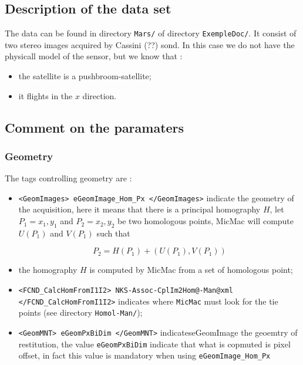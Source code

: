 \subsection{Description of the data set}

The data can be found in directory {\tt Mars/} of directory {\tt ExempleDoc/}.
It consist of two stereo images acquired by Cassini (??) sond. In this case
we do not have the physicall model of the sensor, but we know that :

\begin{itemize}
   \item the satellite is a  pushbroom-satellite;
   \item it flights in the $x$ direction.
\end{itemize}

\subsection{Comment on the paramaters}

\subsubsection{Geometry}

The tags controlling geometry are :

\begin{itemize}

   \item   {\tt <GeomImages> eGeomImage\_Hom\_Px </GeomImages>} indicate the geometry of the acquisition,
          here it means that there is a principal homography $H$, let $P_1=x_1,y_1$ and  $P_2=x_2,y_2$ be two
          homologous points, MicMac will compute $U(P_1)$ and $V(P_1)$ such that

\begin{equation}
    P_2 = H(P_1) + (U(P_1),V(P_1))
\end{equation}

   \item  the homography $H$ is computed by MicMac from a set of homologous point;

   \item  {\tt  <FCND\_CalcHomFromI1I2> NKS-Assoc-CplIm2Hom@-Man@xml  </FCND\_CalcHomFromI1I2>}  indicates
          where {\tt MicMac} must look for the tie points (see directory {\tt Homol-Man/});


   \item  {\tt <GeomMNT> eGeomPxBiDim  </GeomMNT>} indicateseGeomImage the geoemtry of restitution,
          the value {\tt eGeomPxBiDim} indicate that what is copmuted is pixel offset, in fact this value
          is mandatory when using {\tt eGeomImage\_Hom\_Px}


\end{itemize}

